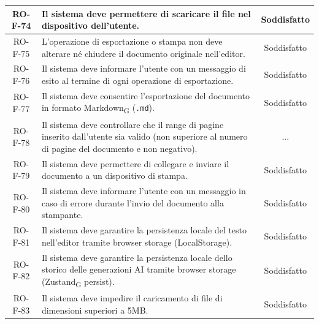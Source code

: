 \documentclass[11pt,a4paper]{article}
\newcommand{\gls}[1]{#1\textsubscript{G}}
\begin{document}
\begin{longtable}{|c|p{11cm}|c|}
\hline
RO-F-74 & Il sistema deve permettere di scaricare il file nel dispositivo dell'utente. & Soddisfatto\\
\hline
RO-F-75 & L'operazione di esportazione o stampa non deve alterare né chiudere il documento originale nell'editor. & Soddisfatto\\
\hline
RO-F-76 & Il sistema deve informare l'utente con un messaggio di esito al termine di ogni operazione di esportazione. & Soddisfatto \\
\hline
RO-F-77 & Il sistema deve consentire l'esportazione del documento in formato \gls{Markdown} (\texttt{.md}). & Soddisfatto \\
\hline
RO-F-78 & Il sistema deve controllare che il range di pagine inserito dall'utente sia valido (non superiore al numero di pagine del documento e non negativo). & ... \\
\hline
RO-F-79 & Il sistema deve permettere di collegare e inviare il documento a un dispositivo di stampa. & Soddisfatto \\
\hline
RO-F-80 & Il sistema deve informare l'utente con un messaggio in caso di errore durante l'invio del documento alla stampante. & Soddisfatto\\
\hline
RO-F-81 & Il sistema deve garantire la persistenza locale del testo nell'editor tramite browser storage (LocalStorage). & Soddisfatto\\
\hline
RO-F-82 & Il sistema deve garantire la persistenza locale dello storico delle generazioni AI tramite browser storage (\gls{Zustand} persist). & Soddisfatto \\
\hline
RO-F-83 & Il sistema deve impedire il caricamento di file di dimensioni superiori a 5MB. & Soddisfatto \\
\hline


\end{longtable}
\end{document}
